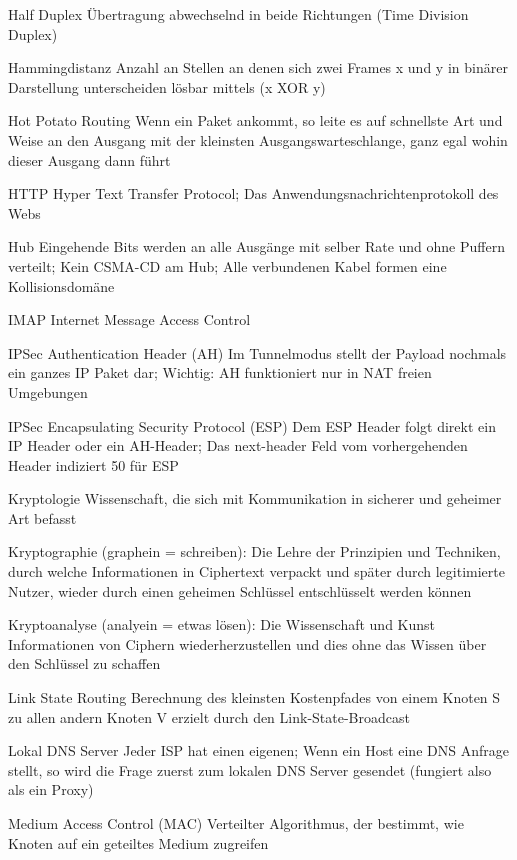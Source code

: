 \documentclass[10pt,landscape]{article}
\begin{document}
\begin{multicols}{3}
\begin{description*}
        \item[Half Duplex] Übertragung abwechselnd in beide Richtungen (Time Division Duplex)
        \item[Hammingdistanz] Anzahl an Stellen an denen sich zwei Frames x und y in binärer Darstellung unterscheiden lösbar mittels (x XOR y)
        \item[Hot Potato Routing] Wenn ein Paket ankommt, so leite es auf schnellste Art und Weise an den Ausgang mit der kleinsten Ausgangswarteschlange, ganz egal wohin dieser Ausgang dann führt
        \item[HTTP] Hyper Text Transfer Protocol; Das Anwendungsnachrichtenprotokoll des Webs
        \item[Hub] Eingehende Bits werden an alle Ausgänge mit selber Rate und ohne Puffern verteilt; Kein CSMA-CD am Hub; Alle verbundenen Kabel formen eine Kollisionsdomäne
        \item[IMAP] Internet Message Access Control
        \item[IPSec Authentication Header (AH)] Im Tunnelmodus stellt der Payload nochmals ein ganzes IP Paket dar; Wichtig: AH funktioniert nur in NAT freien Umgebungen
        \item[IPSec Encapsulating Security Protocol (ESP)] Dem ESP Header folgt direkt ein IP Header oder ein AH-Header; Das next-header Feld vom vorhergehenden Header indiziert 50 für ESP
        \item[Kryptologie] Wissenschaft, die sich mit Kommunikation in sicherer und geheimer Art befasst
        \item[Kryptographie] (graphein = schreiben): Die Lehre der Prinzipien und Techniken, durch welche Informationen in Ciphertext verpackt und später durch legitimierte Nutzer, wieder durch einen geheimen Schlüssel entschlüsselt werden können
        \item[Kryptoanalyse] (analyein = etwas lösen): Die Wissenschaft und Kunst Informationen von Ciphern wiederherzustellen und dies ohne das Wissen über den Schlüssel zu schaffen
        \item[Link State Routing] Berechnung des kleinsten Kostenpfades von einem Knoten S zu allen andern Knoten V erzielt durch den Link-State-Broadcast
        \item[Lokal DNS Server] Jeder ISP hat einen eigenen; Wenn ein Host eine DNS Anfrage stellt, so wird die Frage zuerst zum lokalen DNS Server gesendet (fungiert also als ein Proxy)
        \item[Medium Access Control (MAC)] Verteilter Algorithmus, der bestimmt, wie Knoten auf ein geteiltes Medium zugreifen

\end{description*}
\end{multicols}
\end{document}
